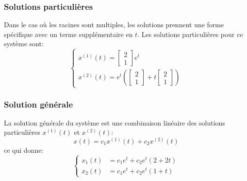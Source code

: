             \subsubsection{Solutions particulières}  
                Dans le cas où les racines sont multiples, les solutions prennent une forme spécifique avec un terme supplémentaire en $t$. Les solutions particulières pour ce système sont:
                \begin{equation}
                    \begin{cases}
                        x^{(1)}(t) = \begin{bmatrix} 2 \\ 1 \end{bmatrix} e^t \\
                        x^{(2)}(t) = e^t \left( \begin{bmatrix} 2 \\ 1 \end{bmatrix} + t \begin{bmatrix} 2 \\ 1 \end{bmatrix} \right)
                    \end{cases}
                \end{equation}
                
            \subsubsection{Solution générale}  
                La solution générale du système est une combinaison linéaire des solutions particulières $x^{(1)}(t)$ et $x^{(2)}(t)$:
                \begin{equation}
                    x(t)=c_1 x^{(1)}(t) + c_2 x^{(2)}(t)
                \end{equation}
                ce qui donne:
                \begin{equation}
                    \begin{cases}
                        x_1(t) &= c_1 e^t + c_2 e^t (2 + 2t) \\
                        x_2(t) &= c_1 e^t + c_2 e^t (1 + t)
                    \end{cases}
                \end{equation}
